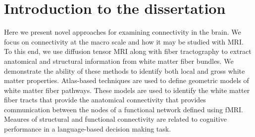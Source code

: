 


\section{Introduction to the dissertation}

Here we present novel approaches for examining connectivity in the brain. We focus on connectivity at the macro scale and how it may be studied with MRI. To this end, we use diffusion tensor MRI along with fiber tractography to extract anatomical and structural information from white matter fiber bundles. We demonstrate the ability of these methods to identify both local and gross white matter properties. Atlas-based techniques are used to define geometric models of white matter fiber pathways. These models are used to identify the white matter fiber tracts that provide the anatomical connectivity that provides communication between the nodes of a functional network defined using fMRI. Meaures of structural and functional connectivity are related to cognitive performance in a language-based decision making task. 

